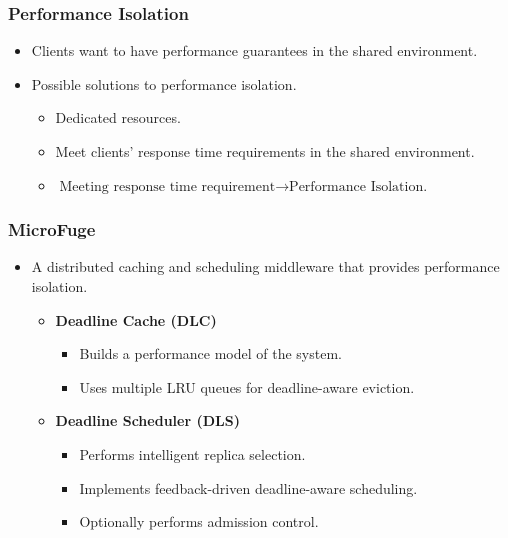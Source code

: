 \documentclass{beamer}
\newcommand{\myv}{\vspace{3 mm}}
\begin{document}
\begin{frame}
  \frametitle{Performance Isolation}
  \begin{itemize}
  \item Clients want to have performance guarantees in the shared
    environment. \myv
  \item Possible solutions to performance isolation.
    \myv
    \begin{itemize}
    \item Dedicated resources.
      \myv
    \item Meet clients' response time requirements in the shared environment.
      \myv
    \item \(\text{Meeting response time requirement} \rightarrow \text{Performance Isolation.}\)
    \end{itemize}
  \end{itemize}
\end{frame}

\begin{frame}
  \frametitle{MicroFuge}
  \begin{itemize}
  \item A distributed caching and scheduling middleware that provides
    performance isolation.
    \myv
  \begin{itemize}
  \item \textbf{Deadline Cache (DLC)}
    \myv
      \begin{itemize}
      \item Builds a performance model of the system.
        \myv
      \item Uses multiple LRU queues for deadline-aware eviction.
        \myv
      \end{itemize}
    \item \textbf{Deadline Scheduler (DLS)}
      \begin{itemize}
        \myv
      \item Performs intelligent replica selection.
        \myv
      \item Implements feedback-driven deadline-aware scheduling.
        \myv
      \item Optionally performs admission control.
      \end{itemize}
  \end{itemize}
  \end{itemize}
\end{frame}
\end{document}
